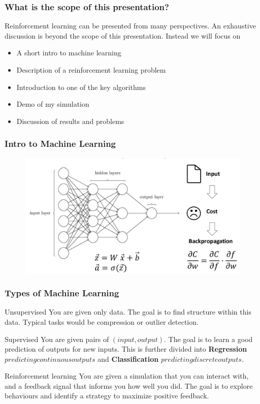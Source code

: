 \documentclass{beamer}
\begin{document}

\begin{frame}
\frametitle{What is the scope of this presentation?}
Reinforcement learning can be presented from many perspectives.
An exhaustive discussion is beyond the scope of this presentation.
Instead we will focus on
\begin{itemize}
\item A short intro to machine learning
\item Description of a reinforcement learning problem
\item Introduction to one of the key algorithms
\item Demo of my simulation
\item Discussion of results and problems
\end{itemize}
\end{frame}

\begin{frame}
\frametitle{Intro to Machine Learning}
\begin{figure}
\includegraphics[height=0.7\textheight]{ml_slide.png}
\end{figure}
\end{frame}


\begin{frame}
\frametitle{Types of Machine Learning}
\begin{block}{Unsupervised}
You are given only data. The goal is to find structure within this data. Typical tasks would be compression or outlier detection.
\end{block}

\begin{block}{Supervised}
You are given pairs of  \((input, output)\). The goal is to learn a good prediction of outputs for new inputs.
This is further divided into \textbf{Regression} \(predicting continuous outputs\) and \textbf{Classification} \(predicting discrete outputs\).
\end{block}

\begin{block}{Reinforcement learning}
You are given a simulation that you can interact with, and a feedback signal that informs you how well you did. The goal is to explore behaviours and identify a strategy to maximize positive feedback.
\end{block}
\end{frame}
\end{document}

